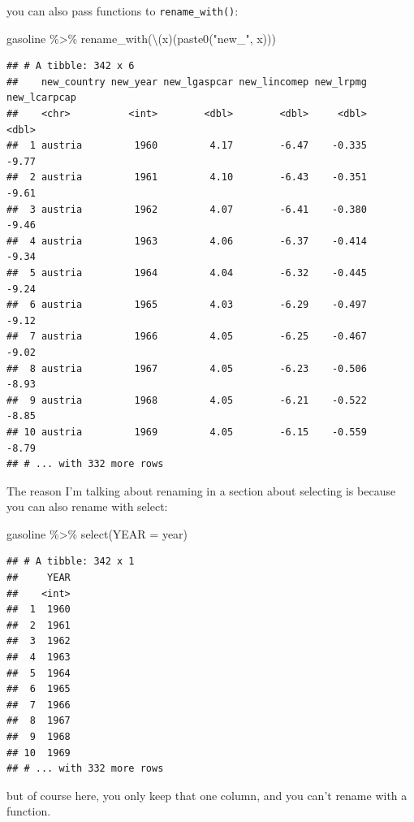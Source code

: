 \documentclass[
]{article}
\newenvironment{Shaded}{\begin{snugshade}}{\end{snugshade}}
\newcommand{\AttributeTok}[1]{\textcolor[rgb]{0.77,0.63,0.00}{#1}}
\newcommand{\FunctionTok}[1]{\textcolor[rgb]{0.00,0.00,0.00}{#1}}
\newcommand{\NormalTok}[1]{#1}
\newcommand{\SpecialCharTok}[1]{\textcolor[rgb]{0.00,0.00,0.00}{#1}}
\newcommand{\StringTok}[1]{\textcolor[rgb]{0.31,0.60,0.02}{#1}}
\begin{document}
you can also pass functions to \texttt{rename\_with()}:

\begin{Shaded}
\begin{Highlighting}[]
\NormalTok{gasoline }\SpecialCharTok{\%\textgreater{}\%}
  \FunctionTok{rename\_with}\NormalTok{(\textbackslash{}(x)(}\FunctionTok{paste0}\NormalTok{(}\StringTok{"new\_"}\NormalTok{, x)))}
\end{Highlighting}
\end{Shaded}

\begin{verbatim}
## # A tibble: 342 x 6
##    new_country new_year new_lgaspcar new_lincomep new_lrpmg new_lcarpcap
##    <chr>          <int>        <dbl>        <dbl>     <dbl>        <dbl>
##  1 austria         1960         4.17        -6.47    -0.335        -9.77
##  2 austria         1961         4.10        -6.43    -0.351        -9.61
##  3 austria         1962         4.07        -6.41    -0.380        -9.46
##  4 austria         1963         4.06        -6.37    -0.414        -9.34
##  5 austria         1964         4.04        -6.32    -0.445        -9.24
##  6 austria         1965         4.03        -6.29    -0.497        -9.12
##  7 austria         1966         4.05        -6.25    -0.467        -9.02
##  8 austria         1967         4.05        -6.23    -0.506        -8.93
##  9 austria         1968         4.05        -6.21    -0.522        -8.85
## 10 austria         1969         4.05        -6.15    -0.559        -8.79
## # ... with 332 more rows
\end{verbatim}

The reason I'm talking about renaming in a section about selecting is because you can
also rename with select:

\begin{Shaded}
\begin{Highlighting}[]
\NormalTok{gasoline }\SpecialCharTok{\%\textgreater{}\%}
  \FunctionTok{select}\NormalTok{(}\AttributeTok{YEAR =}\NormalTok{ year)}
\end{Highlighting}
\end{Shaded}

\begin{verbatim}
## # A tibble: 342 x 1
##     YEAR
##    <int>
##  1  1960
##  2  1961
##  3  1962
##  4  1963
##  5  1964
##  6  1965
##  7  1966
##  8  1967
##  9  1968
## 10  1969
## # ... with 332 more rows
\end{verbatim}

but of course here, you only keep that one column, and you can't rename with a function.
\end{document}
